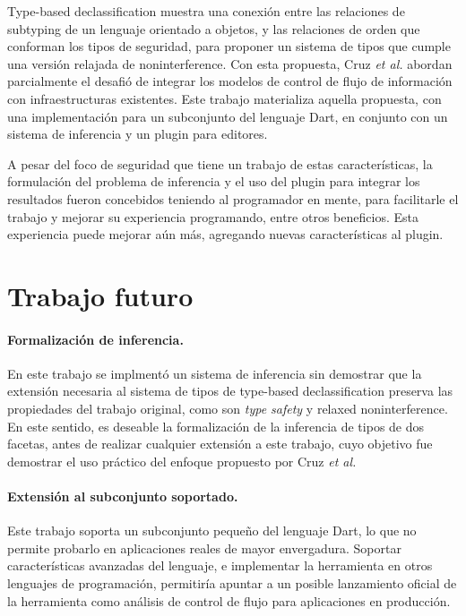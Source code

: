 \begin{conclusion}

	Type-based declassification muestra una conexión entre las relaciones de subtyping de un lenguaje orientado a objetos, y las relaciones de orden que conforman los tipos de seguridad, para proponer un sistema de tipos que cumple una versión relajada de noninterference. Con esta propuesta, Cruz \textit{et al.} abordan parcialmente el desafió de integrar los modelos de control de flujo de información con infraestructuras existentes. Este trabajo materializa aquella propuesta, con una implementación para un subconjunto del lenguaje Dart, en conjunto con un sistema de inferencia y un plugin para editores.

	A pesar del foco de seguridad que tiene un trabajo de estas características, la formulación del problema de inferencia y el uso del plugin para integrar los resultados fueron concebidos teniendo al programador en mente, para facilitarle el trabajo y mejorar su experiencia programando, entre otros beneficios. Esta experiencia puede mejorar aún más, agregando nuevas características al plugin.

	\section*{Trabajo futuro}

	\paragraph{Formalización de inferencia.}En este trabajo se implmentó un sistema de inferencia sin demostrar que la extensión necesaria al sistema de tipos de type-based declassification preserva las propiedades del trabajo original, como son \emph{type safety} y relaxed noninterference. En este sentido, es deseable la formalización de la inferencia de tipos de dos facetas, antes de realizar cualquier extensión a este trabajo, cuyo objetivo fue demostrar el uso práctico del enfoque propuesto por Cruz \textit{et al.}

	\paragraph{Extensión al subconjunto soportado.}Este trabajo soporta un subconjunto pequeño del lenguaje Dart, lo que no permite probarlo en aplicaciones reales de mayor envergadura. Soportar características avanzadas del lenguaje, e implementar la herramienta en otros lenguajes de programación, permitiría apuntar a un posible lanzamiento oficial de la herramienta como análisis de control de flujo para aplicaciones en producción.


\end{conclusion}
